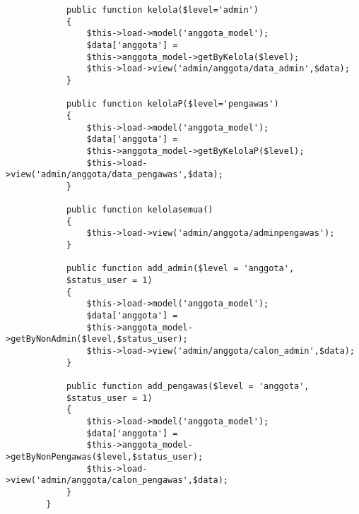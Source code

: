 \begin{verbatim}
			public function kelola($level='admin')
			{
				$this->load->model('anggota_model');
				$data['anggota'] = 
				$this->anggota_model->getByKelola($level);
				$this->load->view('admin/anggota/data_admin',$data);
			}
			
			public function kelolaP($level='pengawas')
			{
				$this->load->model('anggota_model');
				$data['anggota'] = 
				$this->anggota_model->getByKelolaP($level);
				$this->load->view('admin/anggota/data_pengawas',$data);
			}
			
			public function kelolasemua()
			{
				$this->load->view('admin/anggota/adminpengawas');
			}
			
			public function add_admin($level = 'anggota', 
			$status_user = 1)
			{
				$this->load->model('anggota_model');
				$data['anggota'] = 
				$this->anggota_model->getByNonAdmin($level,$status_user);
				$this->load->view('admin/anggota/calon_admin',$data);
			}
			
			public function add_pengawas($level = 'anggota', 
			$status_user = 1)
			{
				$this->load->model('anggota_model');
				$data['anggota'] = 
				$this->anggota_model->getByNonPengawas($level,$status_user);
				$this->load->view('admin/anggota/calon_pengawas',$data);
			}
		}
\end{verbatim}

